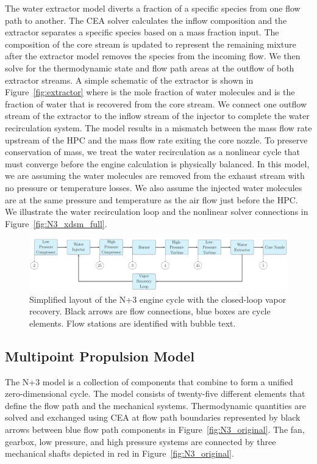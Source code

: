 \documentclass[conf]{new-aiaa}
\begin{document}
The water extractor model diverts a fraction of a specific species from one flow path to another.
The CEA solver calculates the inflow composition and the extractor separates a specific species based on a mass fraction input.
The composition of the core stream is updated to represent the remaining mixture after the extractor model removes the species from the incoming flow.
We then solve for the thermodynamic state and flow path areas at the outflow of both extractor streams.
A simple schematic of the extractor is shown in Figure~\ref{fig:extractor} where  is the mole fraction of water molecules and  is the fraction of water that is recovered from the core stream.
We connect one outflow stream of the extractor to the inflow stream of the injector to complete the water recirculation system.
The model results in a mismatch between the mass flow rate upstream of the HPC and the mass flow rate exiting the core nozzle.
To preserve conservation of mass, we treat the water recirculation as a nonlinear cycle that must converge before the engine calculation is physically balanced.
In this model, we are assuming the water molecules are removed from the exhaust stream with no pressure or temperature losses.
We also assume the injected water molecules are at the same pressure and temperature as the air flow just before the HPC.
We illustrate the water recirculation loop and the nonlinear solver connections in Figure~\ref{fig:N3_xdsm_full}.

\begin{figure}[hbt!]
    \centering
    \includegraphics[width=1.0\textwidth]{N3_CLVR_cycle.pdf}
    \caption{
        Simplified layout of the N+3 engine cycle with the closed-loop vapor recovery.
        Black arrows are flow connections, blue boxes are cycle elements.
        Flow stations are identified with bubble text.
    }
    \label{fig:n3_clvr}
\end{figure}

\subsection{Multipoint Propulsion Model}
The N+3 model is a collection of components that combine to form a unified zero-dimensional cycle.
The model consists of twenty-five different elements that define the flow path and the mechanical systems.
Thermodynamic quantities are solved and exchanged using CEA at flow path boundaries represented by black arrows between blue flow path components in Figure~\ref{fig:N3_original}.
The fan, gearbox, low pressure, and high pressure systems are connected by three mechanical shafts depicted in red in Figure~\ref{fig:N3_original}.
\end{document}
